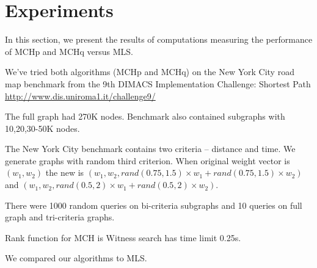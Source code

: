 

\section{Experiments}
\label{secExperiments}
In this section, we present the results of computations measuring the performance
of MCHp and MCHq versus MLS.

We've tried both algorithms (MCHp and MCHq) on the New York City road 
map benchmark from the 9th DIMACS Implementation
Challenge: Shortest Path 
\url{http://www.dis.uniroma1.it/challenge9/}

The full graph had 270K nodes. Benchmark also contained subgraphs with 10,20,30-50K nodes. 

The New York City benchmark contains two criteria -- distance and time. 
We generate graphs with random third criterion. 
When original weight vector is $(w_1,w_2)$ the new is 
$(w_1,w_2,rand(0.75,1.5) \times w_1 + rand(0.75,1.5) \times w_2)$ and
$(w_1,w_2,rand(0.5,2) \times w_1 + rand(0.5,2) \times w_2)$.

There were 1000 random queries on bi-criteria subgraphs and 10 queries
on full graph and tri-criteria graphs. 

Rank function for MCH is 
Witness search has time limit 0.25s. 

We compared our algorithms to MLS.

